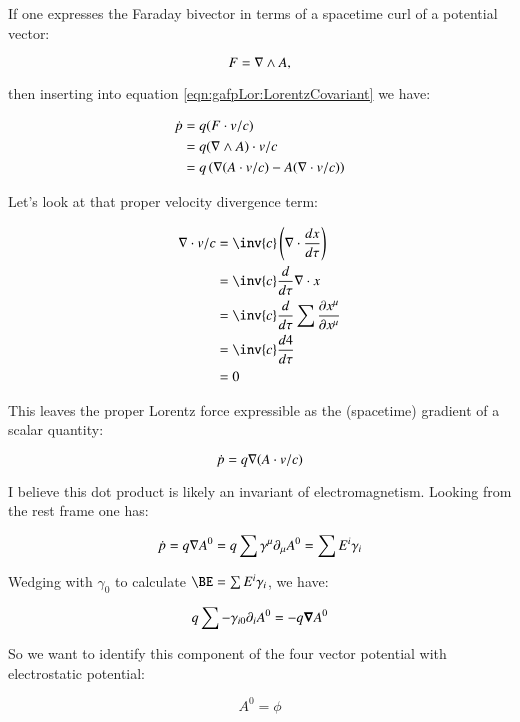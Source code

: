 If one expresses the Faraday bivector in terms of a spacetime curl of a potential vector:

\begin{equation}
F = \nabla \wedge A,
\end{equation}

then inserting into equation \ref{eqn:gafpLor:LorentzCovariant} we have:

\begin{align*}
\dot{p}
&= q ( F \cdot v/c )  \\
&= q (\nabla \wedge A) \cdot v/c \\
&= q \left( \nabla (A \cdot v/c) - A (\nabla \cdot v/c) \right)
\end{align*}

Let's look at that proper velocity divergence term:

\begin{align*}
\grad \cdot v/c
&= \inv{c} \left(\grad \cdot \frac{dx}{d\tau}\right) \\
&= \inv{c} \frac{d}{d\tau} \grad \cdot x \\
&= \inv{c} \frac{d}{d\tau} \sum \frac{\partial x^{\mu}}{\partial x^{\mu}} \\
&= \inv{c} \frac{d 4}{d\tau} \\
&= 0
\end{align*}

This leaves the proper Lorentz force expressible as the (spacetime) gradient of a scalar quantity:

\begin{equation}
\dot{p} = q \nabla (A \cdot v/c)
\end{equation}

I believe this dot product is likely an invariant of electromagnetism.  Looking from the rest frame one has:

\begin{equation}
\dot{p} = q \nabla A^0 = q \sum \gamma^{\mu} \partial_{\mu} A^0 = \sum E^i \gamma_i
\end{equation}

Wedging with $\gamma_0$ to calculate $\BE = \sum E^i \gamma_i$, we have:

\begin{equation*}
q \sum -\gamma_{i0} \partial_{i} A^0 = - q \boldsymbol{\nabla} A^0
\end{equation*}

So we want to identify this component of the four vector potential with electrostatic potential:

\begin{equation}
A^0 = \phi
\end{equation}

